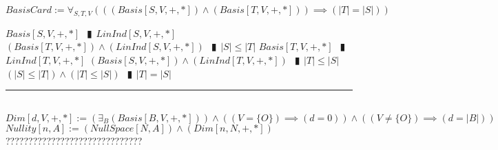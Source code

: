 \documentclass{book}
\newcommand{\abr}{:=}
\newcommand{\pipe}{$\phantom{(}\vrectangleblack\phantom{)}$}
\begin{document}
$BasisCard \abr \forall_{S, T, V}(((Basis[S, V, +, *]) \land (Basis[T, V, +, *])) \implies (|T| = |S|))$
\begin{enumerate}
  \lit $Basis[S, V, +, *]$ \pipe $LinInd[S, V, +, *]$
  \lit $(Basis[T, V, +, *]) \land (LinInd[S, V, +, *])$ \pipe $|S| \leq |T|$
  \lit $Basis[T, V, +, *]$ \pipe $LinInd[T, V, +, *]$
  \lit $(Basis[S, V, +, *]) \land (LinInd[T, V, +, *])$ \pipe $|T| \leq |S|$
  \lit $(|S| \leq |T|) \land (|T| \leq |S|)$ \pipe $|T| = |S|$
\end{enumerate} \vspace{.75mm} \hrule \vspace{.75mm} \ \\ 

$Dim[d, V, +, *] \abr (\exists_{B}(Basis[B, V, +, *])) \land ((V = \{O\}) \implies (d = 0)) \land  ((V \neq \{O\}) \implies (d = |B|))$ \\


$Nullity[n, A] \abr (NullSpace[N, A]) \land (Dim[n, N, +, *])$ \\

??????????????????????????????




\end{document}
